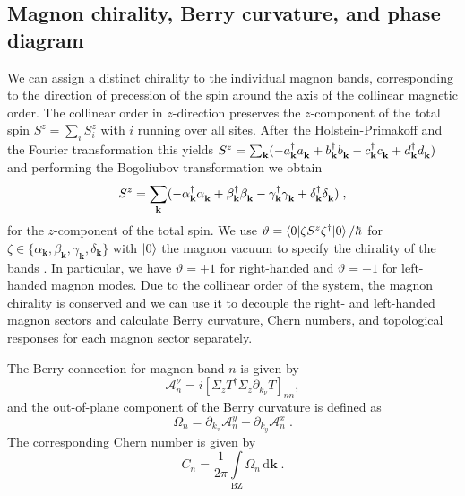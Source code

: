 \documentclass[aps,preprintnumbers,amsmath,amssymb]{revtex4-2}
\begin{document}
\subsection{Magnon chirality, Berry curvature, and phase diagram}\label{sec:MagnonChiralityBerry}
We can assign a distinct chirality to the individual magnon bands, corresponding to the direction of precession of the spin around the axis of the collinear magnetic order. The collinear order in $z$-direction preserves the $z$-component of the total spin $S^z = \sum_{i} S^z_{i}$ with $i$ running over all sites. After the Holstein-Primakoff and the Fourier transformation this yields $S^z = \sum_\mathbf{k} (-a^\dagger_\mathbf{k}a^{\vphantom{\dagger}}_\mathbf{k} + b^\dagger_\mathbf{k}b^{\vphantom{\dagger}}_\mathbf{k} - c^\dagger_\mathbf{k}c^{\vphantom{\dagger}}_\mathbf{k} + d^\dagger_\mathbf{k}d^{\vphantom{\dagger}}_\mathbf{k})$ and performing the Bogoliubov transformation we obtain
\begin{equation}
    S^z = \sum_\mathbf{k} (-\alpha^\dagger_\mathbf{k}\alpha^{\vphantom{\dagger}}_\mathbf{k} + \beta^\dagger_{\mathbf{k}}\beta^{\vphantom{\dagger}}_{\mathbf{k}} - \gamma^\dagger_\mathbf{k}\gamma^{\vphantom{\dagger}}_\mathbf{k} + \delta^\dagger_{\mathbf{k}}\delta^{\vphantom{\dagger}}_{\mathbf{k}})\; , 
\end{equation}
for the $z$-component of the total spin. We use $\vartheta =\braket{0|\zeta S^z \zeta^\dagger|0}/\hbar$ for \mbox{$\zeta \in \{\alpha_\mathbf{k}, \beta_{\mathbf{k}}, \gamma_\mathbf{k}, \delta_{\mathbf{k}}\}$} with $\ket{0}$ the magnon vacuum to specify the chirality of the bands \cite{Cheng2016Nernst}. In particular, we have $\vartheta=+1$ for right-handed and $\vartheta=-1$ for left-handed magnon modes. 
Due to the collinear order of the system, the magnon chirality is conserved and we can use it to decouple the right- and left-handed magnon sectors and calculate Berry curvature, Chern numbers, and topological responses for each magnon sector separately.

The Berry connection for magnon band $n$ is given by \cite{annurev-conmatphys-031620-104715}
\begin{equation}
    \mathcal{A}_n^\nu = i [\Sigma_z T^\dagger \Sigma_z  \partial_{k_\nu} T]_{nn},
\end{equation}
and the out-of-plane component of the Berry curvature is defined as 
\begin{equation}\label{eq:MagnonBerry}
    \Omega_n = \partial_{k_x} \mathcal{A}_n^y - \partial_{k_y} \mathcal{A}_n^x  \; .
\end{equation}
The corresponding Chern number is given by
\begin{equation}
    C_n = \frac{1}{2\pi} \int\limits_\mathrm{BZ} \Omega_n\,  \mathrm{d}\mathbf{k} \; .
\end{equation}
\end{document}
